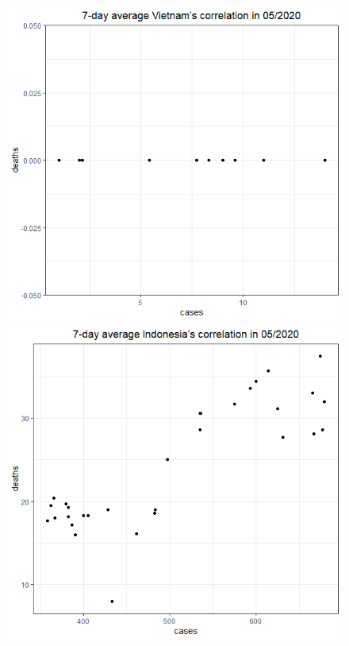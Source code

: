 \documentclass[a4paper]{article}
\theoremstyle{definition}
\begin{document}
\begin{enumerate}[1)]
\begin{figure}[H]
\begin{center}
        \includegraphics[scale = 0.3]{ix/ix.3/VN_05_2020.png}
        \includegraphics[scale = 0.3]{ix/ix.3/IDN_05_2020.png}

\end{center}
\end{figure}
\end{enumerate}
\end{document}
